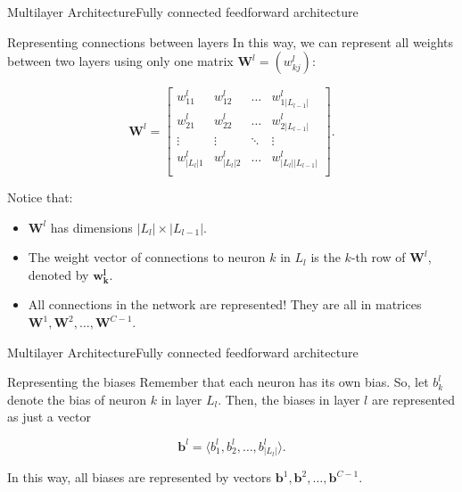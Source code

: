 \documentclass{beamer}
\begin{document}
        \begin{frame}{Multilayer Architecture}{Fully connected feedforward architecture}
            \begin{block}{Representing connections between layers}
                In this way, we can represent all weights between two layers
                using only one matrix $\mathbf{W}^l = (w^l_{kj})$:
        
                \[
                    \mathbf{W}^l = 
                    \begin{bmatrix}
                        w^l_{11} & w^l_{12} & \ldots & w^l_{1|L_{l-1}|}\\
                        w^l_{21} & w^l_{22} & \ldots & w^l_{2|L_{l-1}|}\\
                        \vdots & \vdots & \ddots & \vdots\\
                        w^l_{|L_l|1} & w^l_{|L_l|2} & \ldots & w^l_{|L_l||L_{l-1}|}\\
                    \end{bmatrix}.
                \]                

                Notice that: 
                \begin{itemize}
                    \item $\mathbf{W}^l$ has dimensions $|L_l| \times |L_{l-1}|$.
                    \item The weight vector of connections to neuron $k$ in $L_l$ is the $k$-th row of $\mathbf{W}^l$, denoted by $\mathbf{w^l_k}$.
                    \item All connections in the network are represented! They are all in matrices $\mathbf{W}^1, \mathbf{W}^2, \ldots, \mathbf{W}^{C-1}$.
                \end{itemize}
            \end{block}
        \end{frame}

        \begin{frame}{Multilayer Architecture}{Fully connected feedforward architecture}
            \begin{block}{Representing the biases}
                Remember that each neuron has its own bias. So, let $b^l_k$ denote the
                bias of neuron $k$ in layer $L_l$. Then, the biases in layer $l$ are 
                represented as just a vector 

                $$\mathbf{b}^l = \langle b^l_1, b^l_2, \ldots, b^l_{|L_{l}|} \rangle.$$
                
                In this way, all biases are represented by vectors $\mathbf{b}^1, \mathbf{b}^2, \ldots, \mathbf{b}^{C-1}.$
            \end{block}
        \end{frame}
\end{document}
